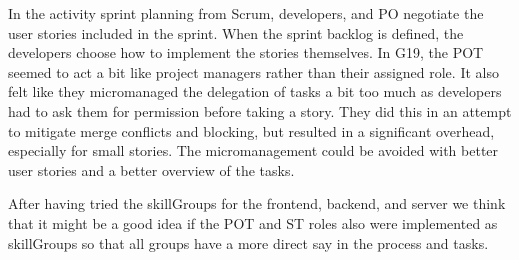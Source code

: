 In the activity sprint planning from Scrum, developers, and \gls{PO} negotiate the user stories included in the sprint. When the sprint backlog is defined, the developers choose how to implement the stories themselves. In \gls{G19}, the \gls{POT} seemed to act a bit like project managers rather than their assigned role. It also felt like they micromanaged the delegation of tasks a bit too much as developers had to ask them for permission before taking a story. They did this in an attempt to mitigate merge conflicts and blocking, but resulted in a significant overhead, especially for small stories. The micromanagement could be avoided with better user stories and a better overview of the tasks.

After having tried the \glspl{skillGroup} for the frontend, backend, and server we think that it might be a good idea if the \gls{POT} and \gls{ST} roles also were implemented as \glspl{skillGroup} so that all groups have a more direct say in the process and tasks.
